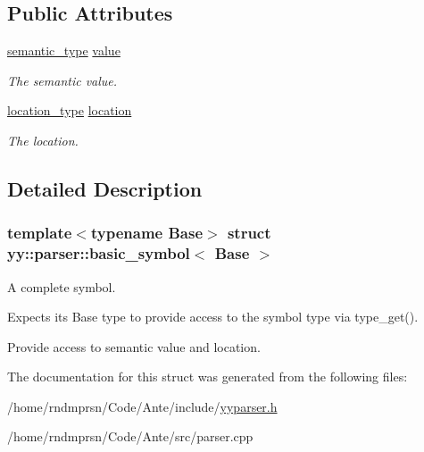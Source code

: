 \subsection*{Public Attributes}
\begin{DoxyCompactItemize}
\item 
\mbox{\label{structyy_1_1parser_1_1basic__symbol_a07710fa55ed90f64504e2fe9b09802ca}} 
\hyperlink{classyy_1_1parser_abb6ca82d9e84da6d4b98e65f650b2456}{semantic\+\_\+type} \hyperlink{structyy_1_1parser_1_1basic__symbol_a07710fa55ed90f64504e2fe9b09802ca}{value}
\begin{DoxyCompactList}\small\item\em The semantic value. \end{DoxyCompactList}\item 
\mbox{\label{structyy_1_1parser_1_1basic__symbol_ac49281f0964e646ecb2fe9b1a7cdfac0}} 
\hyperlink{classyy_1_1parser_a6cee0517f5ed9774dd68ee189b62e454}{location\+\_\+type} \hyperlink{structyy_1_1parser_1_1basic__symbol_ac49281f0964e646ecb2fe9b1a7cdfac0}{location}
\begin{DoxyCompactList}\small\item\em The location. \end{DoxyCompactList}\end{DoxyCompactItemize}


\subsection{Detailed Description}
\subsubsection*{template$<$typename Base$>$\newline
struct yy\+::parser\+::basic\+\_\+symbol$<$ Base $>$}

A complete symbol.

Expects its Base type to provide access to the symbol type via type\+\_\+get().

Provide access to semantic value and location. 

The documentation for this struct was generated from the following files\+:\begin{DoxyCompactItemize}
\item 
/home/rndmprsn/\+Code/\+Ante/include/\hyperlink{yyparser_8h}{yyparser.\+h}\item 
/home/rndmprsn/\+Code/\+Ante/src/parser.\+cpp\end{DoxyCompactItemize}
